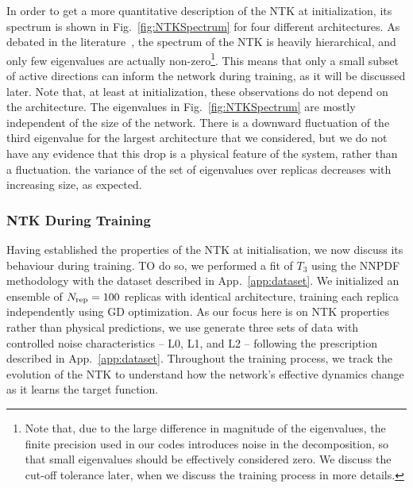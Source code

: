 In order to get a more quantitative description of the NTK at initialization,
its spectrum is shown in Fig.~\ref{fig:NTKSpectrum} for four different
architectures. As debated in the literature~\cite{XXX}, the spectrum of the NTK
is heavily hierarchical, and only few eigenvalues are actually
non-zero\footnote{Note that, due to the large difference in magnitude of the
eigenvalues, the finite precision used in our codes introduces noise in the
decomposition, so that small eigenvalues should be effectively considered zero.
We discuss the cut-off tolerance later, when we discuss the training process in
more details.}. This means that only a small subset of active directions can
inform the network during training, as it will be discussed later. Note that, at
least at initialization, these observations do not depend on the architecture.
The eigenvalues in Fig.~\ref{fig:NTKSpectrum} are mostly independent of the size
of the network. There is a downward fluctuation of the third eigenvalue for the
largest architecture that we considered, but we do not have any evidence that
this drop is a physical feature of the system, rather than a fluctuation. the
variance of the set of eigenvalues over replicas decreases with increasing size,
as expected. 


\subsubsection{NTK During Training}
\label{sec:NTKDuringTraining}


Having established the properties of the NTK at initialisation, we now discuss
its behaviour during training. TO do so, we performed a fit of $T_3$ using the
NNPDF methodology with the dataset described in App.~\ref{app:dataset}. We
initialized an ensemble of $N_{\rm rep} = 100$ replicas with identical architecture,
training each replica independently using GD optimization. As our focus here is
on NTK properties rather than physical predictions, we use generate three sets
of data with controlled noise characteristics -- L0, L1, and L2 -- following the
prescription described in App.~\ref{app:dataset}. Throughout the training
process, we track the evolution of the NTK to understand how the network's
effective dynamics change as it learns the target function.

